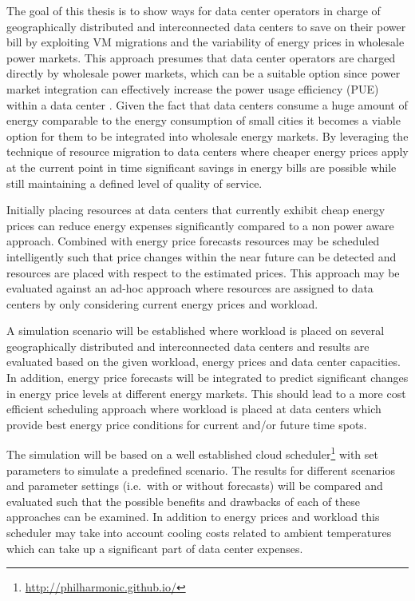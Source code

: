 The goal of this thesis is to show ways for data center operators in charge of geographically distributed and interconnected data centers to save on their power bill by exploiting VM migrations and the variability of energy prices in wholesale power markets. This approach presumes that data center operators are charged directly by wholesale power markets, which can be a suitable option since power market integration can effectively increase the power usage efficiency (PUE) within a data center \cite{dcw2013optimizing}. %
Given the fact that data centers consume a huge amount of energy comparable to the energy consumption of small cities\cite{qureshi2009cutting} it becomes a viable option for them to be integrated into wholesale energy markets. By leveraging the technique of resource migration to data centers where cheaper energy prices apply at the current point in time significant savings in energy bills are possible while still maintaining a defined level of quality of service. 

Initially placing resources at data centers that currently exhibit cheap energy prices can reduce energy expenses significantly compared to a non power aware approach. Combined with energy price forecasts resources may be scheduled intelligently such that price changes within the near future can be detected and resources are placed with respect to the estimated prices. This approach may be evaluated against an ad-hoc approach where resources are assigned to data centers by only considering current energy prices and workload. 

A simulation scenario will be established where workload is placed on several geographically distributed and interconnected data centers and results are evaluated based on the given workload, energy prices and data center capacities. In addition, energy price forecasts will be integrated to predict significant changes in energy price levels at different energy markets. This should lead to a more cost efficient scheduling approach where workload is placed at data centers which provide best energy price conditions for current and/or future time spots. 

The simulation will be based on a well established cloud scheduler\footnote{\url{http://philharmonic.github.io/}} with set parameters to simulate a predefined scenario. The results for different scenarios and parameter settings (i.e.~with or without forecasts) will be compared and evaluated such that the possible benefits and drawbacks of each of these approaches can be examined. 
In addition to energy prices and workload this scheduler may take into account cooling costs related to ambient temperatures which can take up a significant part of data center expenses. 

